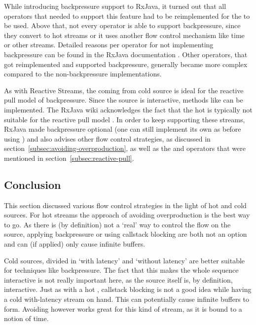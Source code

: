 While introducing backpressure support to RxJava, it turned out that all operators that needed to support this feature had to be reimplemented for the  to be used. Above that, not every operator is able to support backpressure, since they convert to hot streams or it uses another flow control mechanism like time or other streams. Detailed reasons per operator for not implementing backpressure can be found in the RxJava documentation \cite{rx-api}. Other operators, that got reimplemented and supported backpressure, generally became more complex compared to the non-backpressure implementations.

As with Reactive Streams, the \obs coming from cold source is ideal for the reactive pull model of backpressure. Since the source is interactive, methods like  can be implemented. The RxJava wiki acknowledges the fact that the hot \obs is typically not suitable for the reactive pull model \cite{RxJava-Wiki-HotCold}. In order to keep supporting these streams, RxJava made backpressure optional (one can still implement its own \obs as before using ) and also advises other flow control strategies, as discussed in section~\ref{subsec:avoiding-overproduction}, as well as the  and  operators that were mentioned in section~\ref{subsec:reactive-pull}.

\subsection{Conclusion}
This section discussed various flow control strategies in the light of hot and cold sources. For hot streams the approach of avoiding overproduction is the best way to go. As there is (by definition) not a `real' way to control the flow on the source, applying backpressure or using callstack blocking are both not an option and can (if applied) only cause infinite buffers.

Cold sources, divided in `with latency' and `without latency' are better suitable for techniques like backpressure. The fact that this makes the whole \obs sequence interactive is not really important here, as the source itself is,  by definition, interactive. Just as with a hot \obs, callstack blocking is not a good idea while having a cold with-latency stream on hand. This can potentially cause infinite buffers to form. Avoiding however works great for this kind of stream, as it is bound to a notion of time.

